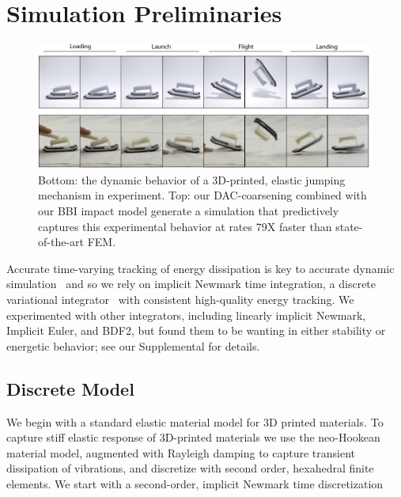 \section{Simulation Preliminaries}
\begin{figure}
	\centering
	\includegraphics[width=0.99\textwidth]{images/dynPhase.png}
	\caption{Bottom: the dynamic behavior of a 3D-printed, elastic jumping mechanism in experiment. Top: our DAC-coarsening combined with our BBI impact model generate a simulation that predictively captures this experimental behavior at rates 79X faster than state-of-the-art FEM.}
	\label{fig:simulationStage}
\end{figure}
\label{sec:simPrelim}
Accurate time-varying tracking of energy dissipation is key to accurate dynamic simulation~\cite{Marsden:2001dj} and so we rely on implicit Newmark time integration, a discrete variational integrator~\cite{Kane:2000dw} with consistent high-quality energy tracking. 
We experimented with other integrators, including linearly implicit Newmark, Implicit Euler, and BDF2, but found them to be wanting in either stability or energetic behavior; see our Supplemental for details.
\subsection{Discrete Model} We begin with a standard elastic material model for 3D printed materials.
To capture stiff elastic response of 3D-printed materials we use the neo-Hookean material model, augmented with Rayleigh damping to capture transient dissipation of vibrations, and discretize with second order, hexahedral finite elements. We start with a second-order, implicit Newmark %
time discretization 

